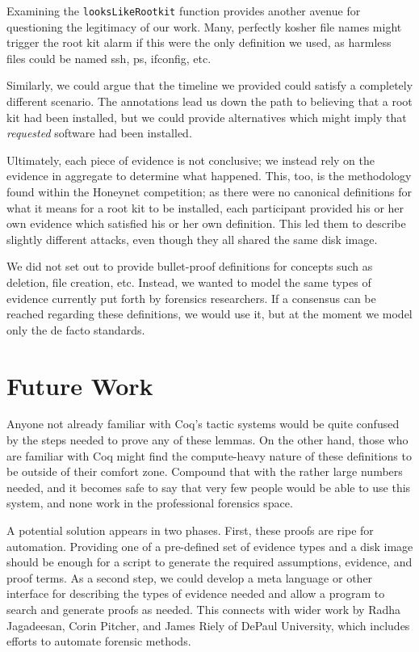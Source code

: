 \documentclass[nocopyrightspace]{sigplanconf}
\begin{document}
Examining the {\tt looksLikeRootkit} function provides another avenue for
questioning the legitimacy of our work. Many, perfectly kosher file names
might trigger the root kit alarm if this were the only definition we used, as
harmless files could be named ssh, ps, ifconfig, etc.

Similarly, we could argue that the timeline we provided could satisfy a
completely different scenario. The annotations lead us down the path to
believing that a root kit had been installed, but we could provide
alternatives which might imply that {\em requested} software had been
installed.

Ultimately, each piece of evidence is not conclusive; we instead rely on the
evidence in aggregate to determine what happened. This, too, is the
methodology found within the Honeynet competition; as there were no canonical
definitions for what it means for a root kit to be installed, each participant
provided his or her own evidence which satisfied his or her own definition.
This led them to describe slightly different attacks, even though they all
shared the same disk image.

We did not set out to provide bullet-proof definitions for concepts such as
deletion, file creation, etc. Instead, we wanted to model the same types of
evidence currently put forth by forensics researchers. If a consensus can be
reached regarding these definitions, we would use it, but at the moment we
model only the de facto standards.

\section{Future Work}
Anyone not already familiar with Coq's tactic systems would be quite confused
by the steps needed to prove any of these lemmas. On the other hand, those who
are familiar with Coq might find the compute-heavy nature of these definitions
to be outside of their comfort zone. Compound that with the rather large
numbers needed, and it becomes safe to say that very few people would be able
to use this system, and none work in the professional forensics space.

A potential solution appears in two phases. First, these proofs are ripe for
automation. Providing one of a pre-defined set of evidence types and a disk
image should be enough for a script to generate the required assumptions,
evidence, and proof terms. As a second step, we could develop a meta language
or other interface for describing the types of evidence needed and allow a
program to search and generate proofs as needed. This connects with wider work
by Radha Jagadeesan, Corin Pitcher, and James Riely of DePaul University,
which includes efforts to automate forensic methods.
\end{document}
